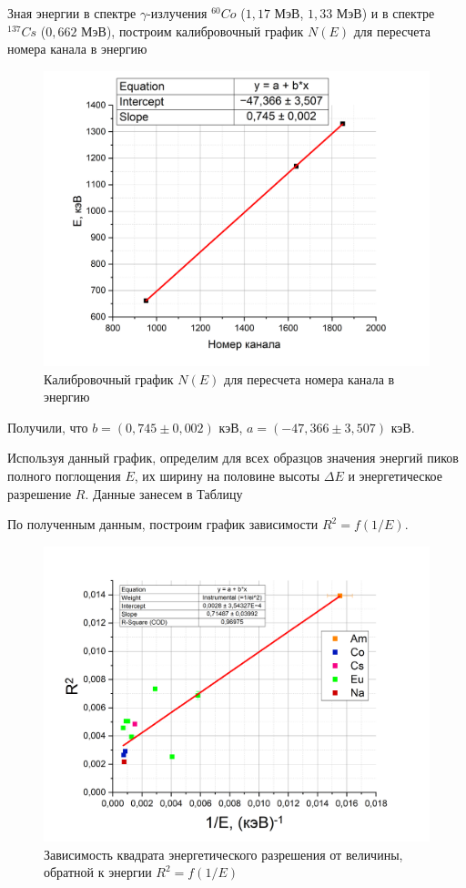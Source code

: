 \documentclass[a4paper,12pt]{article}
\begin{document}
Зная энергии в спектре $\gamma$-излучения $^{60}Co$ ($1,17$ МэВ, $1,33$ МэВ)  и в спектре $^{137}Cs$ ($0,662$ МэВ), построим калибровочный график $N(E)$ для пересчета номера канала в энергию

\begin{figure}[h!]
	\centering
	\includegraphics[width=0.8\linewidth]{graph1}
	\caption{Калибровочный график $N(E)$ для пересчета номера канала в энергию}
	\label{graph7:calibration}
\end{figure}
 
Получили, что $b = (0,745 \pm 0,002)$ кэВ, $a = (-47,366 \pm 3,507)$ кэВ.

\newpage
 
Используя данный график, определим для всех образцов значения энергий пиков полного поглощения $E$, их ширину на половине высоты $\Delta E$ и энергетическое разрешение $R$. Данные занесем в Таблицу %
 
По полученным данным, построим график зависимости $R^2 = f(1/E)$.

\begin{figure}[h!]
	\centering
	\includegraphics[width=0.8\linewidth]{graph2}
	\caption{Зависимость квадрата энергетического разрешения от величины, обратной к энергии $R^2 = f(1/E)$}
	\label{graph8:R^2}
\end{figure}
\end{document}
